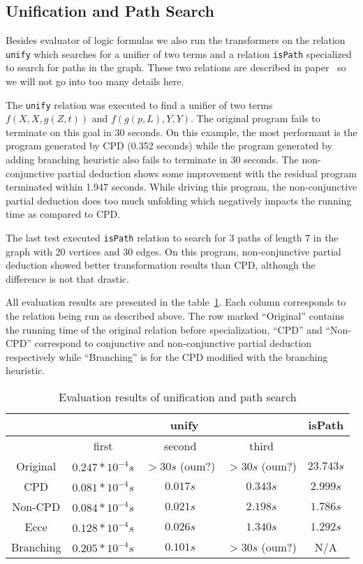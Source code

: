 \subsection{Unification and Path Search}

Besides evaluator of logic formulas we also run the transformers on the relation \lstinline{unify} which searches for a unifier of two terms and a relation \lstinline{isPath} specialized to search for paths in the graph.
These two relations are described in paper~\cite{lozov2019relational} so we will not go into too many details here.

The \lstinline{unify} relation was executed to find a unifier of two terms $f(X, X, g(Z, t))$ and $f(g(p, L), Y, Y)$.
The original \mk{} program fails to terminate on this goal in 30 seconds.
On this example, the most performant is the program generated by CPD (0.352 seconds) while the program generated by adding branching heuristic also fails to terminate in 30 seconds.
The non-conjunctive partial deduction shows some improvement with the residual program terminated within 1.947 seconds.
While driving this program, the non-conjunctive partial deduction does too much unfolding which negatively impacts the running time as compared to CPD.

The last test executed \lstinline{isPath} relation to search for 3 paths of length 7 in the graph with 20 vertices and 30 edges.
On this program, non-conjunctive partial deduction showed better transformation results than CPD, although the difference is not that drastic.

All evaluation results are presented in the table~\ref{tbl:unify}.
Each column corresponds to the relation being run as described above.
The row marked ``Original'' contains the running time of the original \mk{} relation before specialization, ``CPD'' and ``Non-CPD'' correspond to conjunctive and non-conjunctive partial deduction respectively while ``Branching'' is for the CPD modified with the branching heuristic.

\begin{table}
  \centering
  \begin{tabular}{c||c|c|c||c}
                   & \multicolumn{3}{c||}{unify} & isPath \\
  \hline
                   & first  & second & third     &        \\
  \hline\hline
  Original         & $0.247*10^{-4}s$ & $>30s$ (oum?) & $>30s$ (oum?) & $23.743s$ \\
  \hline
  CPD              & $0.081*10^{-4}s$ & $0.017s$ & $0.343s$  & $2.999s$  \\
  \hline
  Non-CPD          & $0.084*10^{-4}s$ & $0.021s$ & $2.198s$  & $1.786s$  \\
  \hline
  Ecce             & $0.128*10^{-4}s$ & $0.026s$ & $1.340s$  & $1.292s$ \\
  \hline
  Branching        & $0.205*10^{-4}s$ & $0.101s$ & $>30s$ (oum?) & N/A \\
  \hline
  \end{tabular}

  \caption{Evaluation results of unification and path search}
  \label{tbl:unify}
\end{table}

